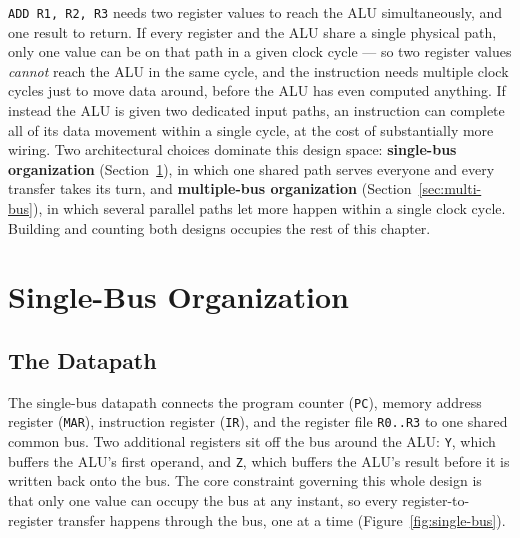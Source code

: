 \documentclass[11pt]{article}
\begin{document}
\texttt{ADD R1, R2, R3} needs two register values to reach the ALU simultaneously, and one result to return. If every register and the ALU share a single physical path, only one value can be on that path in a given clock cycle --- so two register values \emph{cannot} reach the ALU in the same cycle, and the instruction needs multiple clock cycles just to move data around, before the ALU has even computed anything. If instead the ALU is given two dedicated input paths, an instruction can complete all of its data movement within a single cycle, at the cost of substantially more wiring. Two architectural choices dominate this design space: \textbf{single-bus organization} (Section~\ref{sec:single-bus}), in which one shared path serves everyone and every transfer takes its turn, and \textbf{multiple-bus organization} (Section~\ref{sec:multi-bus}), in which several parallel paths let more happen within a single clock cycle. Building and counting both designs occupies the rest of this chapter.

\section{Single-Bus Organization}
\label{sec:single-bus}

\subsection{The Datapath}

The single-bus datapath connects the program counter (\texttt{PC}), memory address register (\texttt{MAR}), instruction register (\texttt{IR}), and the register file \texttt{R0..R3} to one shared common bus. Two additional registers sit off the bus around the ALU: \texttt{Y}, which buffers the ALU's first operand, and \texttt{Z}, which buffers the ALU's result before it is written back onto the bus. The core constraint governing this whole design is that only one value can occupy the bus at any instant, so every register-to-register transfer happens through the bus, one at a time (Figure~\ref{fig:single-bus}).
\end{document}
